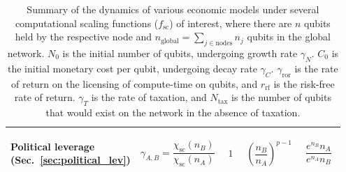 \begin{table}[!htb]
\begin{tabular}{|m{0.21\linewidth}|m{0.21\linewidth}|m{0.15\linewidth}|m{0.155\linewidth}|m{0.225\linewidth}|}
	\hline
	\begin{flushleft}Political leverage (Sec.~\ref{sec:political_lev})\end{flushleft} & \[\gamma_{A,B}=\frac{\chi_\text{sc}(n_B)}{\chi_\text{sc}(n_A)}\] & \[1\] & \[\left(\frac{n_B}{n_A}\right)^{p-1}\] & \[\frac{e^{n_B}n_A}{e^{n_A}n_B}\] \\
	\hline
\end{tabular}
\caption{Summary of the dynamics of various economic models under several computational scaling functions ($f_\text{sc}$) of interest, where there are $n$ qubits held by the respective node and \mbox{$n_\text{global}=\sum_{j\in \text{nodes}} n_j$} qubits in the global network. $N_0$ is the initial number of qubits, undergoing growth rate $\gamma_N$. $C_0$ is the initial monetary cost per qubit, undergoing decay rate $\gamma_C$. $\gamma_\text{ror}$ is the rate of return on the licensing of compute-time on qubits, and $r_\text{rf}$ is the risk-free rate of return. $\gamma_T$ is the rate of taxation, and $N_\text{tax}$ is the number of qubits that would exist on the network in the absence of taxation.} \label{tab:summary_ec_models}
\end{table}

\renewcommand{\arraystretch}{1}
\renewcommand{\tablename}{ALG.}

\clearpage